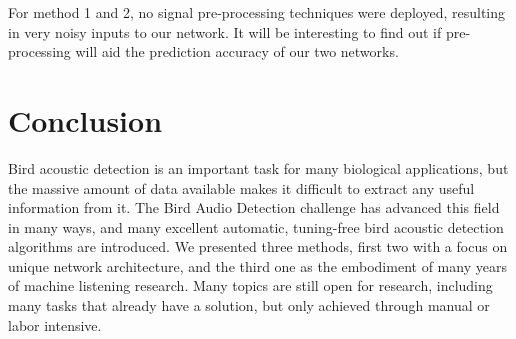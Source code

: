 \documentclass[10pt,twocolumn,letterpaper]{article}
\begin{document}
For method 1 and 2, no signal pre-processing techniques were deployed,
resulting in very noisy inputs to our network. It will be interesting to
find out if pre-processing will aid the prediction accuracy of our two
networks.

\section{Conclusion}

Bird acoustic detection is an important task for many biological
applications, but the massive amount of data available makes it difficult
to extract any useful information from it. The Bird Audio Detection
challenge has advanced this field in many ways, and many excellent
automatic, tuning-free bird acoustic detection algorithms are introduced.
We presented three methods, first two with a focus on unique network
architecture, and the third one as the embodiment of many years of machine
listening research.  Many topics are still open for research, including
many tasks that already have a solution, but only achieved through manual
or labor intensive.


{\small   }
\end{document}
